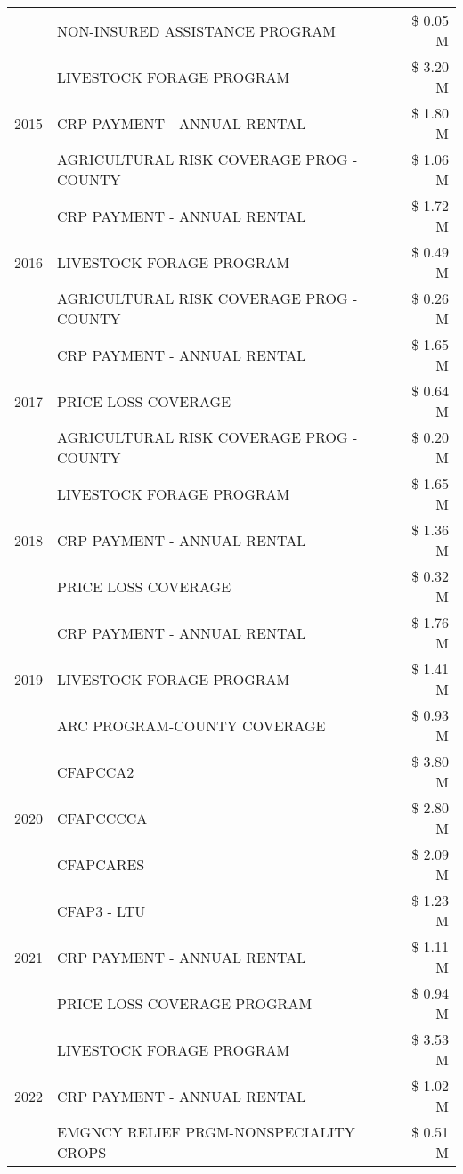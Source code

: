 \begin{tabular}{llr}
 & NON-INSURED ASSISTANCE PROGRAM & \$ 0.05 M \\
\cline{1-3}
\multirow[t]{3}{*}{2015} & LIVESTOCK FORAGE PROGRAM & \$ 3.20 M \\
 & CRP PAYMENT - ANNUAL RENTAL & \$ 1.80 M \\
 & AGRICULTURAL RISK COVERAGE PROG - COUNTY & \$ 1.06 M \\
\cline{1-3}
\multirow[t]{3}{*}{2016} & CRP PAYMENT - ANNUAL RENTAL & \$ 1.72 M \\
 & LIVESTOCK FORAGE PROGRAM & \$ 0.49 M \\
 & AGRICULTURAL RISK COVERAGE PROG - COUNTY & \$ 0.26 M \\
\cline{1-3}
\multirow[t]{3}{*}{2017} & CRP PAYMENT - ANNUAL RENTAL & \$ 1.65 M \\
 & PRICE LOSS COVERAGE & \$ 0.64 M \\
 & AGRICULTURAL RISK COVERAGE PROG - COUNTY & \$ 0.20 M \\
\cline{1-3}
\multirow[t]{3}{*}{2018} & LIVESTOCK FORAGE PROGRAM & \$ 1.65 M \\
 & CRP PAYMENT - ANNUAL RENTAL & \$ 1.36 M \\
 & PRICE LOSS COVERAGE & \$ 0.32 M \\
\cline{1-3}
\multirow[t]{3}{*}{2019} & CRP PAYMENT - ANNUAL RENTAL & \$ 1.76 M \\
 & LIVESTOCK FORAGE PROGRAM & \$ 1.41 M \\
 & ARC PROGRAM-COUNTY COVERAGE & \$ 0.93 M \\
\cline{1-3}
\multirow[t]{3}{*}{2020} & CFAPCCA2 & \$ 3.80 M \\
 & CFAPCCCCA & \$ 2.80 M \\
 & CFAPCARES & \$ 2.09 M \\
\cline{1-3}
\multirow[t]{3}{*}{2021} & CFAP3 - LTU & \$ 1.23 M \\
 & CRP PAYMENT - ANNUAL RENTAL & \$ 1.11 M \\
 & PRICE LOSS COVERAGE PROGRAM & \$ 0.94 M \\
\cline{1-3}
\multirow[t]{3}{*}{2022} & LIVESTOCK FORAGE PROGRAM & \$ 3.53 M \\
 & CRP PAYMENT - ANNUAL RENTAL & \$ 1.02 M \\
 & EMGNCY RELIEF PRGM-NONSPECIALITY CROPS & \$ 0.51 M \\
\cline{1-3}
\bottomrule
\end{tabular}
